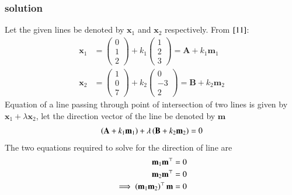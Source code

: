 \documentclass[journal,12pt,onecolumn]{IEEEtran}
\theoremstyle{remark}
\begin{document}
\subsubsection{solution}
Let the given lines be denoted by $\textbf{x}_1$ and $\textbf{x}_2$ respectively. From $\eqref{11}$:
\begin{align}
    \textbf{x}_1 &= \begin{pmatrix}
        0\\
        1\\
        2
    \end{pmatrix} + k_1\begin{pmatrix}
        1\\
        2\\
        3
    \end{pmatrix} = \textbf{A} + k_1\textbf{m}_1 \label{12} \\
    \textbf{x}_2 &= \begin{pmatrix}
        1\\
        0\\
        7
    \end{pmatrix} + k_2\begin{pmatrix}
        0\\
        -3\\
        2
    \end{pmatrix} = \textbf{B} + k_2\textbf{m}_2 \label{13}
\end{align}
Equation of a line passing through point of intersection of two lines is given by $\textbf{x}_1 + \lambda\textbf{x}_2$, let the direction vector of the line be denoted by $\textbf{m}$
\begin{align}
    \left(\textbf{A} + k_1\textbf{m}_1\right) + \lambda\left(\textbf{B} + k_2\textbf{m}_2\right) &= 0\\
\end{align}
The two equations required to solve for the direction of line are 
\begin{align}
\textbf{m}_1\textbf{m}^\top &= 0\\
\textbf{m}_2\textbf{m}^\top &= 0\\
\implies \left(\textbf{m}_1\textbf{m}_2\right)^{\top}\textbf{m} &= 0
\end{align}
\end{document}
